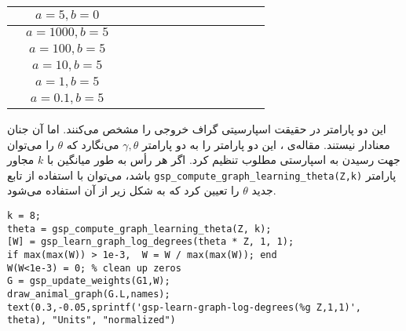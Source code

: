 \begin{center}
\begin{longtable}{ccC{0.65\linewidth}}
		\rownumber & 
		$a = 5, b = 0$ &  \\\hline
		
		\rownumber & 
		$a = 1000, b = 5$ &  \\\hline		
		\rownumber & 
		$a = 100, b = 5$ &  \\\hline
		
		\rownumber & 
		$a = 10, b = 5$ &  \\\hline
		
		\rownumber & 
		$a = 1, b = 5$ &  \\\hline
		
		\rownumber & 
		$a = 0.1, b = 5$ &  \\\hline		
			
\end{longtable}
\end{center}

این دو پارامتر در حقیقت اسپارسیتی گراف خروجی را مشخص می‌کنند. اما آن جنان معنادار نیستند.
مقاله‌ی \cite{largescale-kalofolias2019large}، 
این دو پارامتر را به دو پارامتر $\gamma,\theta$ می‌نگارد که $\theta$ را می‌توان جهت رسیدن به اسپارستی مطلوب تنظیم کرد. اگر هر رأس به طور میانگین با $k$ مجاور باشد، می‌توان با استفاده از تابع 
\verb|gsp_compute_graph_learning_theta(Z,k)|
پارامتر جدید $\theta$ را تعیین کرد که به شکل زیر از آن استفاده می‌شود.

\begin{latin}
\begin{lstlisting}
k = 8;
theta = gsp_compute_graph_learning_theta(Z, k); 
[W] = gsp_learn_graph_log_degrees(theta * Z, 1, 1);
if max(max(W)) > 1e-3,  W = W / max(max(W)); end
W(W<1e-3) = 0; % clean up zeros
G = gsp_update_weights(G1,W);
draw_animal_graph(G.L,names);
text(0.3,-0.05,sprintf('gsp-learn-graph-log-degrees(%g Z,1,1)', theta), "Units", "normalized")
\end{lstlisting}
\end{latin}

